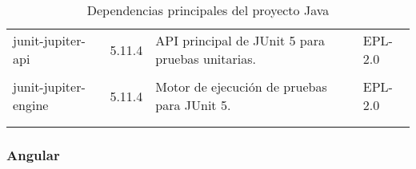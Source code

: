 \begin{longtable}[]{@{}p{}p{}p{}p{}@{}}
    \begin{minipage}[t]{0.18\columnwidth}\raggedright junit-jupiter-api \end{minipage} & \begin{minipage}[t]{0.10\columnwidth}\raggedright 5.11.4 \end{minipage} & \begin{minipage}[t]{0.49\columnwidth}\raggedright API principal de JUnit 5 para pruebas unitarias. \end{minipage} & \begin{minipage}[t]{0.11\columnwidth}\raggedright EPL-2.0 \end{minipage} \\ \tabularnewline

    \begin{minipage}[t]{0.18\columnwidth}\raggedright junit-jupiter-engine \end{minipage} & \begin{minipage}[t]{0.10\columnwidth}\raggedright 5.11.4 \end{minipage} & \begin{minipage}[t]{0.49\columnwidth}\raggedright Motor de ejecución de pruebas para JUnit 5. \end{minipage} & \begin{minipage}[t]{0.11\columnwidth}\raggedright EPL-2.0 \end{minipage} \\ \tabularnewline
    \bottomrule
    \caption{Dependencias principales del proyecto Java}
\end{longtable}


\subsubsection{Angular}

